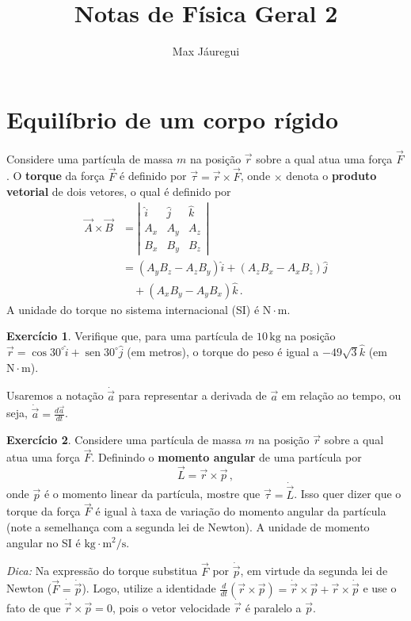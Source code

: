 \documentclass[twocolumn=on,fontsize=12pt,DIV=calc]{scrartcl}
\title{Notas de Física Geral 2}
\author{Max Jáuregui}
\theoremstyle{definition}
\newtheorem{ex}{Exercício}[section]
\DeclareMathOperator{\sen}{sen}
\begin{document}
\maketitle
\tableofcontents

\section{Equilíbrio de um corpo rí\-gi\-do}

Considere uma partícula de massa $m$ na posição $\vec r$ sobre a qual
atua uma força $\vec F$. O \textbf{torque} da força $\vec F$ é definido
por $\vec\tau=\vec r\times\vec F$, onde $\times$ denota o
\textbf{produto vetorial} de dois vetores, o qual é definido por
\begin{equation*}
  \begin{split}
    \vec A\times\vec B&= \left|
      \begin{array}{ccc}
        \hat i&\hat j&\hat k\\
        A_x&A_y&A_z\\
        B_x&B_y&B_z
      \end{array}
    \right|\\
    &=(A_yB_z-A_zB_y)\hat i+(A_zB_x-A_xB_z)\hat j\\
    &\quad+(A_xB_y-A_yB_x)\hat k\,.
  \end{split}
\end{equation*}
A unidade do torque no sistema internacional (SI) é
$\mathrm{N}\cdot\mathrm{m}$.

\begin{ex}
  Verifique que, para uma par\-tí\-cu\-la de $10\,\mathrm{kg}$ na posição
  $\vec r=\cos 30^\circ\hat i+\sen 30^\circ\hat j$ (em metros), o
  torque do peso é igual a $-49\sqrt{3}\hat k$ (em
  $\mathrm{N}\cdot \mathrm{m}$).
\end{ex}

Usaremos a notação $\dot{\vec a}$ para representar a derivada de
$\vec a$ em relação ao tempo, ou seja,
$\dot{\vec a}=\frac{d\vec a}{dt}$.

\begin{ex}
  Considere uma partícula de massa $m$ na posição $\vec r$ sobre a
  qual atua uma força $\vec F$. Definindo o \textbf{momento angular} de
  uma partícula por
  $$\vec L=\vec r\times\vec p\,,$$
   onde $\vec p$ é o  momento linear da partícula, mostre que $\vec\tau=\dot{\vec
    L}$. Isso quer dizer que o torque da força $\vec F$ é igual à taxa
  de variação do momento angular da partícula (note a semelhança com a
  segunda lei de Newton). A unidade de momento angular no SI é
  $\mathrm{kg}\cdot\mathrm{m^2/s}$.

  \noindent\textit{Dica:} Na expressão do torque substitua $\vec F$ por
  $\dot{\vec p}$, em virtude da segunda lei de Newton
  ($\vec F=\dot{\vec p}$). Logo, utilize a identidade
  $\frac{d}{dt}(\vec r\times\vec p)=\dot{\vec r}\times\vec p+\vec
  r\times\dot{\vec p}$ e use o fato de que
  $\dot{\vec r}\times\vec p=0$, pois o vetor velocidade $\dot{\vec r}$
  é paralelo a $\vec p$.
\end{ex}
\end{document}
